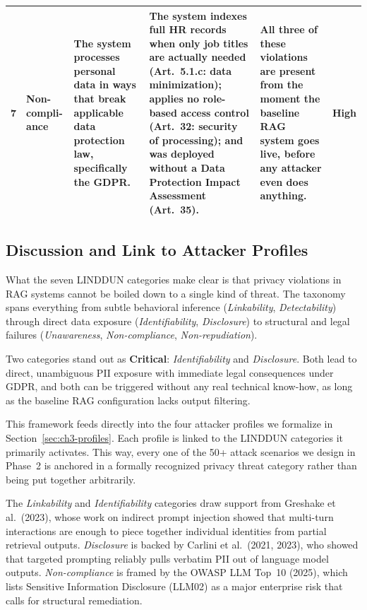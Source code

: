 \documentclass[12pt,a4paper]{report}
\newcommand{\badgecritical}{\colorbox{gray!15}{\footnotesize\textbf{Critical}}}
\newcommand{\badgehigh}{\colorbox{gray!15}{\footnotesize\textbf{High}}}
\begin{document}
\begin{longtable}{C{0.42cm}W{1.9cm}W{3.0cm}W{3.5cm}W{3.0cm}C{1.65cm}}
  
  \small 7 &
  \small\textbf{Non-compli-ance} &
  \small The system processes personal data in ways that break applicable
  data protection law, specifically the GDPR. &
  \small The system indexes full HR records when only job titles are actually
  needed (Art.~5.1.c: data minimization); applies no role-based access
  control (Art.~32: security of processing); and was deployed without a Data
  Protection Impact Assessment (Art.~35). &
  \small All three of these violations are present from the moment
  the baseline RAG system goes live, before any attacker even does anything. &
  \badgehigh \\[4pt]

  \bottomrule
\end{longtable}

\subsection{Discussion and Link to Attacker Profiles}

What the seven LINDDUN categories make clear is that privacy violations in RAG
systems cannot be boiled down to a single kind of threat. The taxonomy spans
everything from subtle behavioral inference (\emph{Linkability},
\emph{Detectability}) through direct data exposure (\emph{Identifiability},
\emph{Disclosure}) to structural and legal failures (\emph{Unawareness},
\emph{Non-compliance}, \emph{Non-repudiation}).

Two categories stand out as \badgecritical: \emph{Identifiability} and
\emph{Disclosure}. Both lead to direct, unambiguous PII exposure with
immediate legal consequences under GDPR, and both can be triggered without
any real technical know-how, as long as the baseline RAG configuration lacks
output filtering.

This framework feeds directly into the four attacker profiles we formalize in
Section~\ref{sec:ch3-profiles}. Each profile is linked to the LINDDUN categories it primarily
activates. This way, every one of the 50+ attack scenarios we design in Phase~2
is anchored in a formally recognized privacy threat category rather than being
put together arbitrarily.

The \emph{Linkability} and \emph{Identifiability} categories draw support from
Greshake et al.\ (2023), whose work on indirect prompt injection showed
that multi-turn interactions are enough to piece together individual identities
from partial retrieval outputs. \emph{Disclosure} is backed by
Carlini et al.\ (2021, 2023), who showed that targeted prompting reliably
pulls verbatim PII out of language model outputs.
\emph{Non-compliance} is framed by the OWASP LLM Top~10 (2025), which
lists Sensitive Information Disclosure (LLM02) as a major enterprise
risk that calls for structural remediation.
\end{document}
